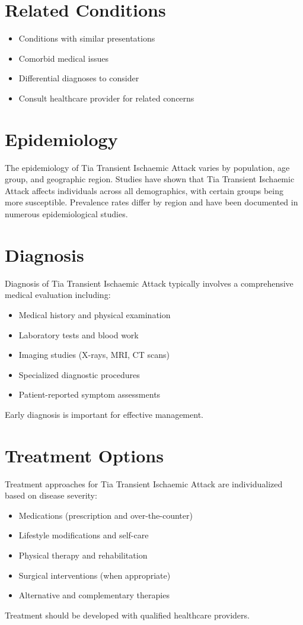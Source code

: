 \section*{Related Conditions}
\begin{itemize}
  \item Conditions with similar presentations
  \item Comorbid medical issues
  \item Differential diagnoses to consider
  \item Consult healthcare provider for related concerns
\end{itemize}

\section*{Epidemiology}
The epidemiology of Tia Transient Ischaemic Attack varies by population, age group, and geographic region. Studies have shown that Tia Transient Ischaemic Attack affects individuals across all demographics, with certain groups being more susceptible. Prevalence rates differ by region and have been documented in numerous epidemiological studies.

\section*{Diagnosis}
Diagnosis of Tia Transient Ischaemic Attack typically involves a comprehensive medical evaluation including:
\begin{itemize}
  \item Medical history and physical examination
  \item Laboratory tests and blood work
  \item Imaging studies (X-rays, MRI, CT scans)
  \item Specialized diagnostic procedures
  \item Patient-reported symptom assessments
\end{itemize}
Early diagnosis is important for effective management.

\section*{Treatment Options}
Treatment approaches for Tia Transient Ischaemic Attack are individualized based on disease severity:
\begin{itemize}
  \item Medications (prescription and over-the-counter)
  \item Lifestyle modifications and self-care
  \item Physical therapy and rehabilitation
  \item Surgical interventions (when appropriate)
  \item Alternative and complementary therapies
\end{itemize}
Treatment should be developed with qualified healthcare providers.

